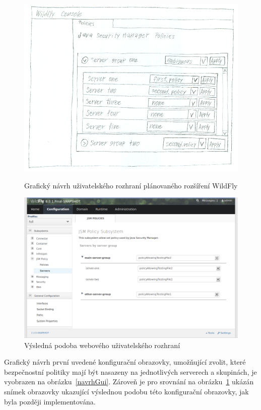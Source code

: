 \begin{figure}[t!]

  \centering
  \includegraphics[width=14cm]{fig/mockup}
  \caption{Grafický návrh uživatelského rozhraní plánovaného rozšíření WildFly \newline\newline}
  \label{navrhGui}

  \includegraphics[width=14cm]{fig/jsmpolicy-servers}
  \caption{Výsledná podoba webového uživatelského rozhraní\newline}
  \label{vysledneGui}

\end{figure}

Grafický návrh první uvedené konfigurační obrazovky, umožňující zvolit, které bezpečnostní politiky mají být nasazeny na jednotlivých serverech a skupinách, je vyobrazen na obrázku~\ref{navrhGui}. Zároveň je pro srovnání na obrázku~\ref{vysledneGui} ukázán snímek obrazovky ukazující výslednou podobu této konfigurační obrazovky, jak byla později implementována.

